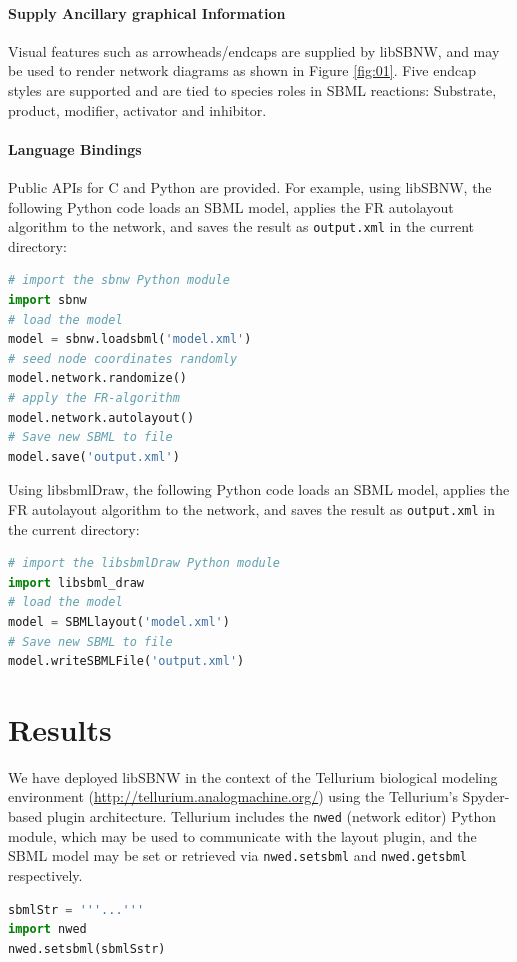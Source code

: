 \documentclass{bioinfo}
\begin{document}
\paragraph{Supply Ancillary graphical Information}
Visual features such as arrowheads/endcaps are supplied by libSBNW, and may be used to render network diagrams as shown in Figure \ref{fig:01}. Five endcap styles are supported and are tied to species roles in SBML reactions: Substrate, product, modifier, activator and inhibitor. 

\paragraph{Language Bindings}
Public APIs for C and Python are provided.
For example, using libSBNW, the following Python code loads
an SBML model, applies the FR autolayout algorithm to the network, and saves the result as \texttt{output.xml} in the current directory:

\medskip
\noindent

\begin{lstlisting}[language=python]
# import the sbnw Python module
import sbnw
# load the model
model = sbnw.loadsbml('model.xml')
# seed node coordinates randomly
model.network.randomize()
# apply the FR-algorithm
model.network.autolayout()
# Save new SBML to file
model.save('output.xml')
\end{lstlisting}

Using libsbmlDraw, the following Python code loads an SBML model, applies the FR autolayout algorithm to the network, and saves the result as \texttt{output.xml} in the current directory:

\medskip
\noindent

\begin{lstlisting}[language=python]
# import the libsbmlDraw Python module
import libsbml_draw
# load the model
model = SBMLlayout('model.xml')
# Save new SBML to file
model.writeSBMLFile('output.xml')
\end{lstlisting}


\section{Results}

We have deployed libSBNW in the context of the Tellurium biological modeling environment (\href{http://tellurium.analogmachine.org/}{http://tellurium.analog\-mach\-ine.org/}) using the Tellurium's Spyder-based plugin architecture.
Tellurium includes the \texttt{nwed} (network editor) Python module, which may be used to communicate with the layout plugin, and
the SBML model may be set or retrieved via \texttt{nwed.setsbml} and
\texttt{nwed.getsbml} respectively.
%
\begin{lstlisting}[language=python]
sbmlStr = '''...'''
import nwed
nwed.setsbml(sbmlSstr)
\end{lstlisting}
\end{document}

